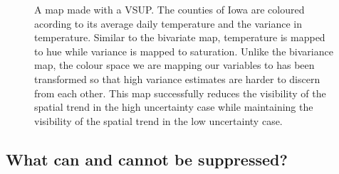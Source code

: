 \documentclass[
  12pt]{article}
\begin{document}
\begin{figure}
\begin{minipage}{0.33\linewidth}
\end{minipage}%
%
\begin{minipage}{0.33\linewidth}



\end{minipage}%

\caption{\label{fig-vsup}A map made with a VSUP. The counties of Iowa
are coloured acording to its average daily temperature and the variance
in temperature. Similar to the bivariate map, temperature is mapped to
hue while variance is mapped to saturation. Unlike the bivariance map,
the colour space we are mapping our variables to has been transformed so
that high variance estimates are harder to discern from each other. This
map successfully reduces the visibility of the spatial trend in the high
uncertainty case while maintaining the visibility of the spatial trend
in the low uncertainty case.}

\end{figure}%

\subsection{What can and cannot be
suppressed?}\label{what-can-and-cannot-be-suppressed}
\end{document}
